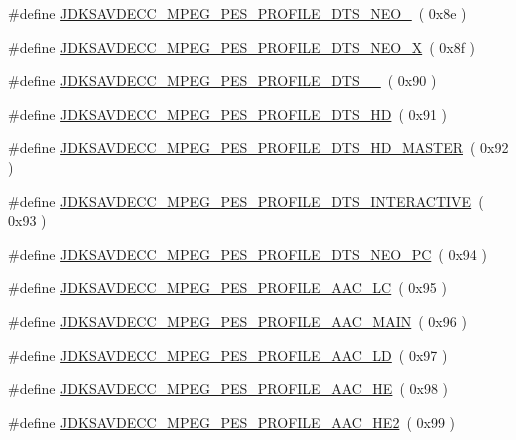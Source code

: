 \begin{DoxyCompactItemize}
\#define \hyperlink{group__mpeg__pes__profile_ga11a82c311a629098c2ba8753fd6f116d}{J\+D\+K\+S\+A\+V\+D\+E\+C\+C\+\_\+\+M\+P\+E\+G\+\_\+\+P\+E\+S\+\_\+\+P\+R\+O\+F\+I\+L\+E\+\_\+\+D\+T\+S\+\_\+\+N\+E\+O\+\_}~( 0x8e )
\item 
\#define \hyperlink{group__mpeg__pes__profile_ga341441171e0deb9a544a13fab87346be}{J\+D\+K\+S\+A\+V\+D\+E\+C\+C\+\_\+\+M\+P\+E\+G\+\_\+\+P\+E\+S\+\_\+\+P\+R\+O\+F\+I\+L\+E\+\_\+\+D\+T\+S\+\_\+\+N\+E\+O\+\_\+X}~( 0x8f )
\item 
\#define \hyperlink{group__mpeg__pes__profile_ga2a710518b1c02495ad0b397f26cb5c52}{J\+D\+K\+S\+A\+V\+D\+E\+C\+C\+\_\+\+M\+P\+E\+G\+\_\+\+P\+E\+S\+\_\+\+P\+R\+O\+F\+I\+L\+E\+\_\+\+D\+T\+S\+\_\+\_}~( 0x90 )
\item 
\#define \hyperlink{group__mpeg__pes__profile_ga6812cac54612b98c6c2782fdf5877706}{J\+D\+K\+S\+A\+V\+D\+E\+C\+C\+\_\+\+M\+P\+E\+G\+\_\+\+P\+E\+S\+\_\+\+P\+R\+O\+F\+I\+L\+E\+\_\+\+D\+T\+S\+\_\+\+HD}~( 0x91 )
\item 
\#define \hyperlink{group__mpeg__pes__profile_ga8e5a93a879b8996160b4a00b4e4fb934}{J\+D\+K\+S\+A\+V\+D\+E\+C\+C\+\_\+\+M\+P\+E\+G\+\_\+\+P\+E\+S\+\_\+\+P\+R\+O\+F\+I\+L\+E\+\_\+\+D\+T\+S\+\_\+\+H\+D\+\_\+\+M\+A\+S\+T\+ER}~( 0x92 )
\item 
\#define \hyperlink{group__mpeg__pes__profile_gac2e4fe0fd4141ffa611ae20b2cadc381}{J\+D\+K\+S\+A\+V\+D\+E\+C\+C\+\_\+\+M\+P\+E\+G\+\_\+\+P\+E\+S\+\_\+\+P\+R\+O\+F\+I\+L\+E\+\_\+\+D\+T\+S\+\_\+\+I\+N\+T\+E\+R\+A\+C\+T\+I\+VE}~( 0x93 )
\item 
\#define \hyperlink{group__mpeg__pes__profile_gac79b67672be43c424d745721e913aecc}{J\+D\+K\+S\+A\+V\+D\+E\+C\+C\+\_\+\+M\+P\+E\+G\+\_\+\+P\+E\+S\+\_\+\+P\+R\+O\+F\+I\+L\+E\+\_\+\+D\+T\+S\+\_\+\+N\+E\+O\+\_\+\+PC}~( 0x94 )
\item 
\#define \hyperlink{group__mpeg__pes__profile_gae0908033cade1523b775ffa0340aca19}{J\+D\+K\+S\+A\+V\+D\+E\+C\+C\+\_\+\+M\+P\+E\+G\+\_\+\+P\+E\+S\+\_\+\+P\+R\+O\+F\+I\+L\+E\+\_\+\+A\+A\+C\+\_\+\+LC}~( 0x95 )
\item 
\#define \hyperlink{group__mpeg__pes__profile_ga406e9ee0e84f290775982a27d55bd0f4}{J\+D\+K\+S\+A\+V\+D\+E\+C\+C\+\_\+\+M\+P\+E\+G\+\_\+\+P\+E\+S\+\_\+\+P\+R\+O\+F\+I\+L\+E\+\_\+\+A\+A\+C\+\_\+\+M\+A\+IN}~( 0x96 )
\item 
\#define \hyperlink{group__mpeg__pes__profile_ga394afb81530b6b7f7c220c3c9355f8b7}{J\+D\+K\+S\+A\+V\+D\+E\+C\+C\+\_\+\+M\+P\+E\+G\+\_\+\+P\+E\+S\+\_\+\+P\+R\+O\+F\+I\+L\+E\+\_\+\+A\+A\+C\+\_\+\+LD}~( 0x97 )
\item 
\#define \hyperlink{group__mpeg__pes__profile_ga8ae361c7a8d7a3e017d75f27869090ce}{J\+D\+K\+S\+A\+V\+D\+E\+C\+C\+\_\+\+M\+P\+E\+G\+\_\+\+P\+E\+S\+\_\+\+P\+R\+O\+F\+I\+L\+E\+\_\+\+A\+A\+C\+\_\+\+HE}~( 0x98 )
\item 
\#define \hyperlink{group__mpeg__pes__profile_gaf4c745bf675356a7e02b2d1daf7ba6e3}{J\+D\+K\+S\+A\+V\+D\+E\+C\+C\+\_\+\+M\+P\+E\+G\+\_\+\+P\+E\+S\+\_\+\+P\+R\+O\+F\+I\+L\+E\+\_\+\+A\+A\+C\+\_\+\+H\+E2}~( 0x99 )
\end{DoxyCompactItemize}


